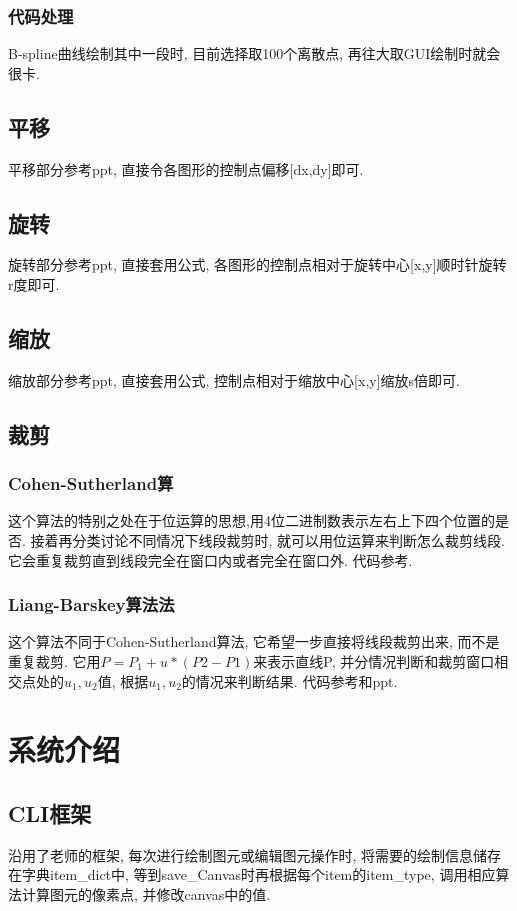 \documentclass[a4paper,UTF8]{article}
\theoremstyle{definition}
\begin{document}
\subsubsection{代码处理}
B-spline曲线绘制其中一段时, 目前选择取100个离散点, 再往大取GUI绘制时就会很卡.

\subsection{平移}
\indent 平移部分参考ppt, 直接令各图形的控制点偏移[dx,dy]即可.

\subsection{旋转}
\indent 旋转部分参考ppt, 直接套用公式, 各图形的控制点相对于旋转中心[x,y]顺时针旋转r度即可.

\subsection{缩放}
\indent 缩放部分参考ppt, 直接套用公式, 控制点相对于缩放中心[x,y]缩放s倍即可.

\subsection{裁剪}
\subsubsection{Cohen-Sutherland算} 
这个算法的特别之处在于位运算的思想,用4位二进制数表示左右上下四个位置的是否. 接着再分类讨论不同情况下线段裁剪时, 就可以用位运算来判断怎么裁剪线段. 它会重复裁剪直到线段完全在窗口内或者完全在窗口外.
代码参考\cite{cohen_web}.\\
\subsubsection{Liang-Barskey算法法} 
这个算法不同于Cohen-Sutherland算法, 它希望一步直接将线段裁剪出来, 而不是重复裁剪.
它用$P=P_1+u*(P2-P1)$来表示直线P, 并分情况判断和裁剪窗口相交点处的$u_1,u_2$值, 根据$u_1,u_2$的情况来判断结果.
代码参考\cite{liang_web}和ppt.

\section{系统介绍}
\subsection{CLI框架}
沿用了老师的框架, 每次进行绘制图元或编辑图元操作时, 将需要的绘制信息储存在字典item\_dict中, 等到save\_Canvas时再根据每个item的item\_type, 调用相应算法计算图元的像素点, 并修改canvas中的值.
\end{document}
